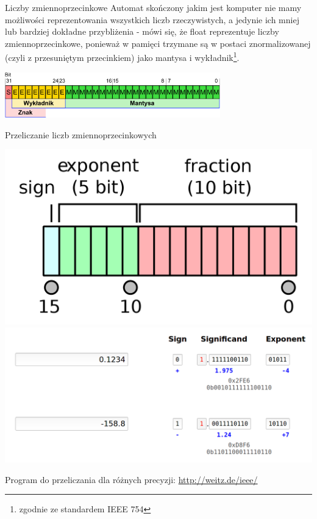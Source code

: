 \begin{frame}{Liczby zmiennoprzecinkowe}
    Automat skończony jakim jest komputer nie mamy możliwości reprezentowania wszystkich liczb
    rzeczywistych, a jedynie ich mniej lub bardziej dokładne przybliżenia - mówi się, że float
    reprezentuje liczby zmiennoprzecinkowe, ponieważ w pamięci trzymane są w postaci znormalizowanej
    (czyli z przesuniętym przecinkiem) jako mantysa i wykładnik\footnote{zgodnie ze standardem IEEE 754}.
    \begin{center}
        \includegraphics[width=0.7\textwidth]{data_structures/graphics/ieee_full.png}
    \end{center}
\end{frame}

\begin{frame}{Przeliczanie liczb zmiennoprzecinkowych}
    \begin{center}
        \includegraphics[height=0.2\textheight]{data_structures/graphics/ieee_half.png} \\
        \includegraphics[height=0.45\textheight]{data_structures/graphics/calculations.png}
    \end{center}
    Program do przeliczania dla różnych precyzji: \url{http://weitz.de/ieee/}
\end{frame}

